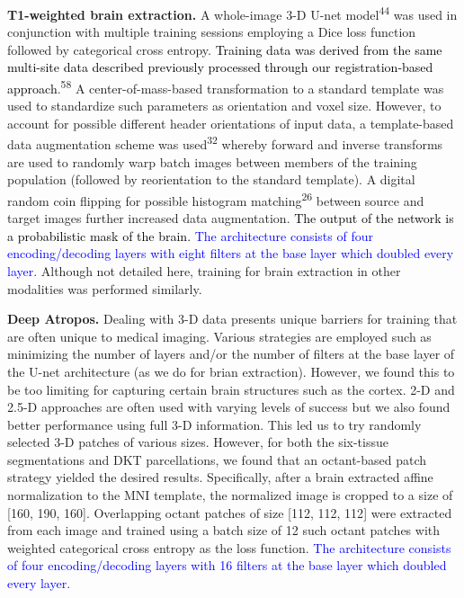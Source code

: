 \documentclass[
  12pt,
]{article}
\begin{document}
\textbf{T1-weighted brain extraction.} A whole-image 3-D U-net
model\textsuperscript{44} was used in conjunction with multiple training
sessions employing a Dice loss function followed by categorical cross
entropy. \textcolor{black}{Training data
was derived from the same multi-site data described previously processed through
our registration-based approach}.\textsuperscript{58} A
center-of-mass-based transformation to a standard template was used to
standardize such parameters as orientation and voxel size. However, to
account for possible different header orientations of input data, a
template-based data augmentation scheme was used\textsuperscript{32}
whereby forward and inverse transforms are used to randomly warp batch
images between members of the training population (followed by
reorientation to the standard template). A digital random coin flipping
for possible histogram matching\textsuperscript{26} between source and
target images further increased data augmentation.
\textcolor{black}{The output of the network
is a probabilistic mask of the brain.} \textcolor{blue}{The architecture
consists of four encoding/decoding layers with eight filters at the base layer
which doubled every layer.} Although not detailed here, training for
brain extraction in other modalities was performed similarly.

\textbf{Deep Atropos.} Dealing with 3-D data presents unique barriers
for training that are often unique to medical imaging. Various
strategies are employed such as minimizing the number of layers and/or
the number of filters at the base layer of the U-net architecture (as we
do for brian extraction). However, we found this to be too limiting for
capturing certain brain structures such as the cortex. 2-D and 2.5-D
approaches are often used with varying levels of success but we also
found better performance using full 3-D information. This led us to try
randomly selected 3-D patches of various sizes. However, for both the
six-tissue segmentations and DKT parcellations, we found that an
octant-based patch strategy yielded the desired results. Specifically,
after a brain extracted affine normalization to the MNI template, the
normalized image is cropped to a size of {[}160, 190, 160{]}.
Overlapping octant patches of size {[}112, 112, 112{]} were extracted
from each image and trained using a batch size of 12 such octant patches
with weighted categorical cross entropy as the loss function.
\textcolor{blue}{The architecture consists of four encoding/decoding
layers with 16 filters at the base layer which doubled every layer.}
\end{document}
